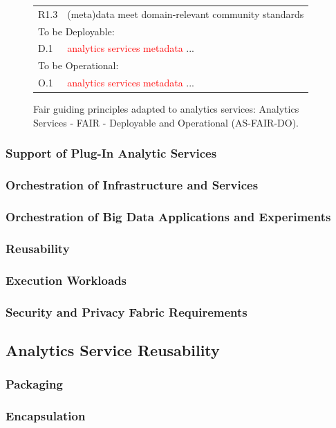 \documentclass[12pt]{article}
\begin{document}
\begin{figure}[htb]
{{\begin{tabular}{p{1cm}p{15cm}}
R1.3 & (meta)data meet domain-relevant community standards \\
\multicolumn{2}{l}{To be Deployable:}\\
D.1 & \textcolor{red}{analytics services metadata} ... \\
\multicolumn{2}{l}{To be Operational:} \\ 
O.1 & \textcolor{red}{analytics services metadata} ... \\ 
\end{tabular}
}
}
\caption{Fair guiding principles adapted to analytics services: Analytics Services - FAIR - Deployable and Operational
(AS-FAIR-DO).}\label{fig:as-fair-do}
\end{figure}


 




\subsubsection{Support of Plug-In Analytic Services}
\subsubsection{Orchestration of Infrastructure and Services}
\subsubsection{Orchestration of Big Data Applications and Experiments}
\subsubsection{Reusability}
\subsubsection{Execution Workloads}
\subsubsection{Security and Privacy Fabric Requirements}

\subsection{Analytics Service Reusability}
\subsubsection{Packaging}
\subsubsection{Encapsulation}
\end{document}
